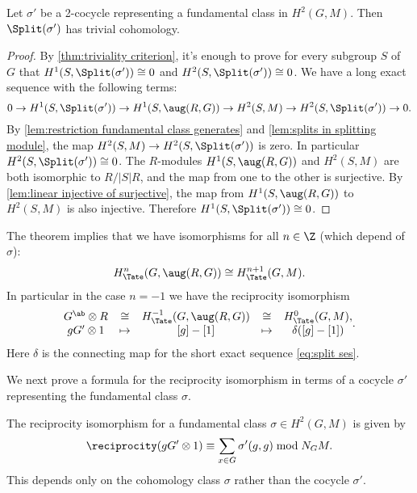 \begin{theorem} \label{thm:splitting module trivial}
	Let $\sigma'$ be a 2-cocycle representing a fundamental class in $H^2(G,M)$.
	Then $\Split(\sigma')$ has trivial cohomology.
\end{theorem}

\begin{proof}
	By \ref{thm:triviality criterion}, it's enough to prove for every subgroup $S$ of $G$ that
	$H^1(S,\Split(\sigma')) \cong 0$ and $H^2(S,\Split(\sigma')) \cong 0$.
	We have a long exact sequence with the following terms:
	\[
		0 \to H^1(S,\Split(\sigma')) \to H^1(S,\aug(R,G)) \to H^2(S,M) \to H^2(S,\Split(\sigma'))
		\to 0.
	\]
	By \ref{lem:restriction fundamental class generates} and \ref{lem:splits in splitting module},
	the map $H^2(S,M) \to H^2(S,\Split(\sigma'))$ is zero.
	In particular $H^2(S,\Split(\sigma')) \cong 0$.
	The $R$-modules $H^1(S,\aug(R,G))$ and $H^2(S,M)$ are both isomorphic to $R / |S|R$,
	and the map from one to the other is surjective.
	By \ref{lem:linear injective of surjective}, the map
	from $H^1(S,\aug(R,G))$ to $H^2(S,M)$ is also injective.
	Therefore $H^1(S,\Split(\sigma')) \cong 0$.
\end{proof}

\begin{definition} \label{def:reciprocity iso}
	The theorem implies that we have isomorphisms for all $n\in \Z$ (which depend of $\sigma$):
	\[
		H^{n}_{\Tate}(G,\aug(R,G)) \cong H^{n+1}_{\Tate}(G,M) .
	\]
	In particular in the case $n = -1$ we have the reciprocity isomorphism
	\[
		\begin{matrix}
			G^{\ab} \otimes R & \cong & H^{-1}_{\Tate}(G,\aug(R,G)) &\cong&  H^0_{\Tate}(G,M), \\
			gG' \otimes 1 & \mapsto & [g] - [1] & \mapsto & \delta ([g] - [1])
		\end{matrix}.
	\]
	Here $\delta$ is the connecting map for the short exact sequence \ref{eq:split ses}.
\end{definition}

We next prove a formula for the reciprocity isomorphism in terms of
a cocycle $\sigma'$ representing the fundamental class $\sigma$.

\begin{lemma} \label{lem:reciprocity formula}
	The reciprocity isomorphism for a fundamental class $\sigma \in H^2(G,M)$ is given by
	\[
		\reciprocity(gG' \otimes 1) \equiv  \sum_{x \in G} \sigma'(g,g) \bmod N_G M.
	\]
	This depends only on the cohomology class $\sigma$ rather than the cocycle $\sigma'$.
\end{lemma}


